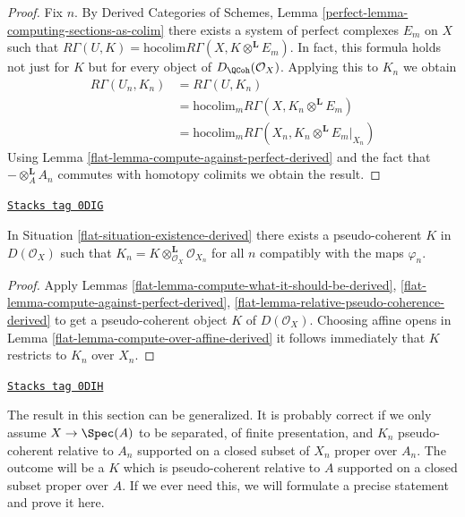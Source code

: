 \begin{proof}

Fix $n$. By Derived Categories of Schemes, Lemma
\ref{perfect-lemma-computing-sections-as-colim}
there exists a system of perfect complexes $E_m$
on $X$ such that
$R\Gamma(U, K) = \text{hocolim} R\Gamma(X, K \otimes^\mathbf{L} E_m)$.
In fact, this formula holds not just for $K$ but for every object of
$D_\QCoh(\mathcal{O}_X)$.
Applying this to $K_n$
we obtain
\begin{align*}
R\Gamma(U_n, K_n)
& =
R\Gamma(U, K_n) \\
& =
\text{hocolim}_m R\Gamma(X, K_n \otimes^\mathbf{L} E_m) \\
& =
\text{hocolim}_m R\Gamma(X_n, K_n \otimes^\mathbf{L} E_m|_{X_n})
\end{align*}
Using Lemma \ref{flat-lemma-compute-against-perfect-derived}
and the fact that $- \otimes_A^\mathbf{L} A_n$
commutes with homotopy colimits we obtain the result.
\end{proof}

\begin{theorem}

\label{flat-theorem-existence-derived}
\href{https://stacks.math.columbia.edu/tag/0DIG}{\texttt{Stacks tag 0DIG}}

In Situation \ref{flat-situation-existence-derived}
there exists a pseudo-coherent $K$ in $D(\mathcal{O}_X)$
such that $K_n = K \otimes_{\mathcal{O}_X}^\mathbf{L} \mathcal{O}_{X_n}$
for all $n$ compatibly with the maps $\varphi_n$.
\end{theorem}

\begin{proof}

Apply Lemmas \ref{flat-lemma-compute-what-it-should-be-derived},
\ref{flat-lemma-compute-against-perfect-derived},
\ref{flat-lemma-relative-pseudo-coherence-derived}
to get a pseudo-coherent object $K$ of $D(\mathcal{O}_X)$.
Choosing affine opens in Lemma
\ref{flat-lemma-compute-over-affine-derived}
it follows immediately that $K$ restricts to $K_n$ over $X_n$.
\end{proof}

\begin{remark}
\label{flat-remark-correct-generality}
\href{https://stacks.math.columbia.edu/tag/0DIH}{\texttt{Stacks tag 0DIH}}

The result in this section can be generalized. It is probably correct
if we only assume $X \to \Spec(A)$ to be separated, of finite presentation,
and $K_n$ pseudo-coherent relative to $A_n$ supported on a closed
subset of $X_n$ proper over $A_n$. The outcome will be a $K$ which
is pseudo-coherent relative to $A$ supported on a closed subset
proper over $A$. If we ever need this, we will
formulate a precise statement and prove it here.
\end{remark}

